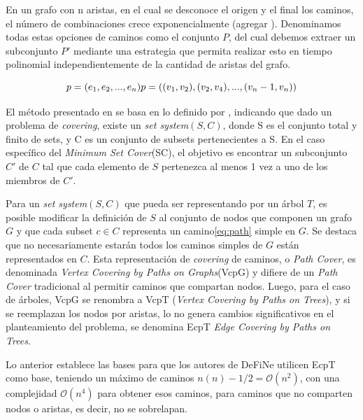 En un grafo con n aristas, en el cual se desconoce el origen y el final los caminos, el n\'umero de combinaciones crece exponencialmente (agregar \cite{buchin2007number}\cite{biswas2012hamiltonian}). Denominamos todas estas opciones de caminos como el conjunto $P$, del cual debemos extraer un subconjunto $P'$ mediante una estrategia que permita realizar esto en tiempo polinomial independientemente de la cantidad de aristas del grafo.

\begin{equation}
p = (e_1, e_2,..., e_n)\\
p = ((v_1,v_2), (v_2,v_4),..., (v_n-1,v_n))
\label{eq:path}
\end{equation}

El m\'etodo presentado en \cite{breuer2015define} se basa en lo definido por \cite{lin2006vertex}, indicando que dado un problema de {\it covering}, existe un {\it set system}$(S,C)$, donde S es el conjunto total y finito de sets, y C es un conjunto de subsets pertenecientes a S. En el caso espec\'ifico del {\it Minimum Set Cover}(SC), el objetivo es encontrar un subconjunto $C'$ de $C$ tal que cada elemento de $S$ pertenezca al menos 1 vez a uno de los miembros de $C'$.

Para un {\it set system}$(S,C)$ que pueda ser representando por un \'arbol $T$, es posible modificar la definici\'on de $S$ al conjunto de nodos que componen un grafo $G$ y que cada subset $c \in C$ representa un camino\eqref{eq:path} simple en $G$. Se destaca que no necesariamente estar\'an todos los caminos simples de $G$ est\'an representados en $C$. Esta representaci\'on de {\it covering} de caminos, o {\it Path Cover}, es denominada {\it Vertex Covering by Paths on Graphs}(VcpG) y difiere de un {\it Path Cover} tradicional al permitir caminos que compartan nodos. Luego, para el caso de \'arboles, VcpG se renombra a VcpT ({\it Vertex Covering by Paths on Trees}), y si se reemplazan los nodos por aristas, lo no genera cambios significativos en el planteamiento del problema, se denomina EcpT {\it Edge Covering by Paths on Trees}. %


Lo anterior establece las bases para que los autores de DeFiNe\cite{breuer2015define} utilicen EcpT como base, teniendo un m\'aximo de caminos $n(n)-1/2 = \mathcal{O}(n^{2})$, con una complejidad $\mathcal{O}(n^{4})$ para obtener esos caminos, para caminos que no comparten nodos o aristas, es decir, no se sobrelapan.

